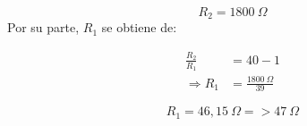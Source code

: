 \documentclass[a4paper,12pt]{article}
\begin{document}
\begin{equation}
    \boxed{
    R_2 = 1800~\Omega
    }
\end{equation}
\vspace{0.2cm}
\hspace{1mm}Por su parte, $R_1$ se obtiene de:

\begin{equation}
    \begin{aligned}
        \frac{R_2}{R_1} &= 40 - 1 \\
    \Longrightarrow R_1 &= \frac{1800~\Omega}{39}
    \end{aligned}
\end{equation}

\begin{equation}
    \boxed{
    R_1 = 46,15~\Omega=>47~\Omega
    }
\end{equation}
\bigskip
\end{document}
